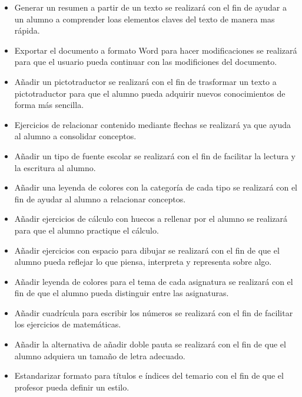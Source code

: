 \begin{itemize}
  \item Generar un resumen a partir de un texto se realizará con el fin de ayudar a un alumno a comprender loas elementos claves del texto de manera mas rápida.
  \item Exportar el documento a formato Word para hacer modificaciones se realizará para que el usuario pueda continuar con las modificiones del documento. 
  \item Añadir un pictotraductor se realizará con el fin de trasformar un texto a pictotraductor para que el alumno pueda adquirir nuevos conocimientos de forma más sencilla.
  \item Ejercicios de relacionar contenido mediante flechas se realizará ya que ayuda al alumno a consolidar conceptos.
  \item Añadir un tipo de fuente escolar se realizará con el fin de facilitar la lectura y la escritura al alumno.
  \item Añadir una leyenda de colores con la categoría de cada tipo se realizará con el fin de  ayudar al alumno a relacionar conceptos. 
  \item  Añadir ejercicios de cálculo con huecos a rellenar por el alumno se realizará para que el alumno practique el cálculo.
  \item  Añadir ejercicios con espacio para dibujar se realizará con el fin de que el alumno pueda reflejar lo que piensa, interpreta y representa sobre algo.
  \item Añadir leyenda de colores para el tema de cada asignatura se realizará con el fin de que el alumno pueda distinguir entre las asignaturas.
  \item Añadir cuadrícula para escribir los números se realizará con el fin de facilitar los ejercicios de matemáticas.
  \item Añadir la alternativa de añadir doble pauta se realizará con el fin de que el alumno adquiera un tamaño de letra adecuado.
  \item Estandarizar formato para títulos e índices del temario con el fin de que el profesor pueda definir un estilo. 

\end{itemize}                                               

